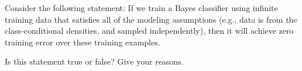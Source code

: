 Consider the following statement: If we train a Bayes classifier using infinite training data that satisfies all of the modeling assumptions (e.g., data is from the class-conditional densities, and sampled independently), then it will achieve zero training error over these training examples.


Is this statement true or false? Give your reasons.

